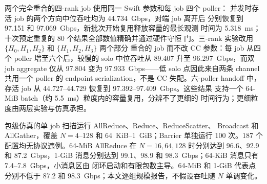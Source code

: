 \begin{table}[t]
\centering
\small
\caption{三个物理系统的 AllReduce 消息大小矩阵。括号内为全系统
datapath poller 数：Arbor 每 rank 2 个（共 8 个），ATP 的 PS 为 8 个、
三个 worker 各 4 个（共 20 个），SwitchML 每 rank 8 个（共 32 个）。
三者均为 $N=4$、$J=1$、$A=1024$；每格报告五个新进程的中位 logical
goodput（Gbps）。该表等量约束物理聚合状态而非端侧 CPU。}
\label{tab:physical-allreduce-size}
\setlength{\tabcolsep}{7pt}
\end{table}

两个完全重合的四-rank job 使用同一 Swift 参数和每 job 四个 poller：
并发时存活 job 的两个方向中位吞吐均为 44.734~Gbps，对端 job 离开后
分别恢复到 97.151 和 97.069~Gbps，新批次开始复用释放容量的最长观测
时间为 5.318~ms；十次预定重复的 80 个结果全部数值精确并通过硬件守恒
门。三-rank 实验改用 $\{H_0,H_1,H_2\}$ 和 $\{H_1,H_2,H_3\}$ 两个部分
重合的 job 而不改 CC 参数：每 job 从四个 poller 增至六个后，较慢的
solo 中位吞吐从 89.407 升至 96.297~Gbps，而双 job aggregate 仅从
97.804 变为 97.933~Gbps——低 solo 点因此来自两条 channel 共用一个
poller 的 endpoint serialization，不是 CC 失配。六-poller handoff
中，存活 job 从 44.727--44.729 恢复到 97.392--97.409~Gbps。这些结果
支持一个 64-MiB batch（约 5.5~ms）粒度内的容量复用，分辨不了更细的
时间行为；更细粒度由两层实验与仿真承担。

包级仿真的单 job 扫描运行 AllReduce、Reduce、ReduceScatter、
Broadcast 和 AllGather，覆盖 $N=4$--128 和 64~KiB--1~GiB；Barrier
单独运行 100 次。187 个配置均无协议违例。64-MiB AllReduce 在
$N=16,64,128$ 时分别达到 96.6、92.9 和 87.2~Gbps，1-GiB 消息分别达到
99.1、98.9 和 98.3~Gbps；64-KiB 消息只有 7.4--7.8~Gbps，小消息区由
闭环启动和有限包数主导。64-MiB 和 1-GiB 代表点分别不低于 87.2 和
98.3~Gbps；本文逐组规模报告，不假设吞吐随 $N$ 单调变化。

